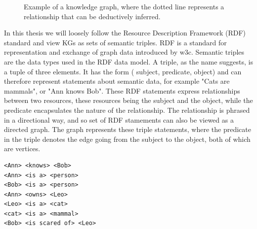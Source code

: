 \begin{figure}
\centering
{}

\caption{Example of a knowledge graph, where the dotted line represents a relationship that can be deductively inferred.} \label{fig:KGexample}
\end{figure}

\newpage

In this thesis we will loosely follow the Resource Description Framework (RDF) standard and view KGs as sets of semantic triples. RDF is a standard for representation and exchange of graph data introduced by \gls{w3c}. Semantic triples are the data types used in the RDF data model. A triple, as the name suggests, is a tuple of three elements. It has the form ( subject, predicate, object) and can therefore represent statements about semantic data, for example "Cats are mammals", or "Ann knows Bob". These RDF statements express relationships between two resources, these resources being the subject and the object, while the predicate encapsulates the nature of the relationship. The relationship is phrased in a directional way, and so set of RDF stamements can also be viewed as a directed graph. The graph represents these triple statements, where the predicate in the triple denotes the edge going from the subject to the object, both of which are vertices.

\begin{lstlisting}[caption={Example of RDF triple set written in informal pseudocode},label={RDF_triples_example}]
<Ann> <knows> <Bob>
<Ann> <is a> <person>
<Bob> <is a> <person>
<Ann> <owns> <Leo>
<Leo> <is a> <cat>
<cat> <is a> <mammal>
<Bob> <is scared of> <Leo>
\end{lstlisting}

